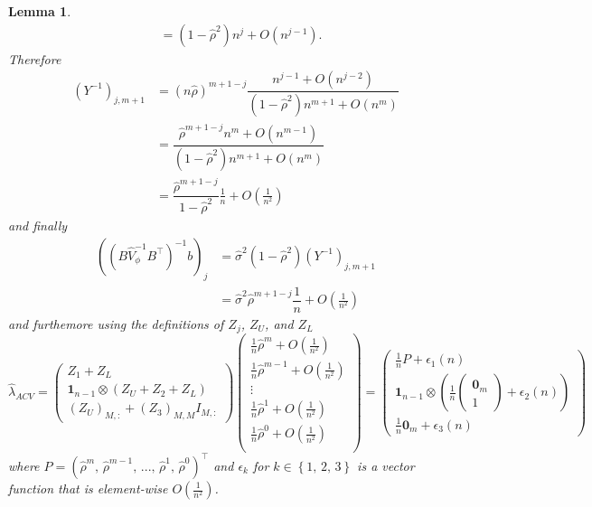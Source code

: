 \documentclass[11pt,dvipsnames]{article}
\newtheorem{lemma}{Lemma}
\begin{document}
\begin{appendices}
\begin{lemma}
\begin{equation}
\begin{split}
&=(1-\hat{\rho}^{2})n^{j}+O(n^{j-1}).
\end{split}
\end{equation}
Therefore 
\begin{equation}
\begin{split}
\left( Y ^{-1}\right) _{j,m+1}&= \left( n\hat{\rho}\right) ^{m+1-j} \dfrac{n^{j-1}+O(n^{j-2})}{(1-\hat{\rho}^{2})n^{m+1}+O(n^{m})}\\
&=\dfrac{\hat{\rho}^{m+1-j}n^{m}+O(n^{m-1})}{(1-\hat{\rho}^{2})n^{m+1}+O(n^{m})}\\
&=\dfrac{\hat{\rho}^{m+1-j}}{1-\hat{\rho}^{2}}\frac{1}{n}+O\left( \frac{1}{n^{2}}\right) 
\end{split}
\end{equation}
and finally
\begin{equation}
\begin{split}
\left( \left( B\widehat{V}_{\phi}^{-1}B^{\top}\right) ^{-1}b\right)_{j}&=\hat{\sigma}^{2}\left( 1-\hat{\rho}^{2}\right) \left( Y ^{-1}\right) _{j,m+1}\\
&=\hat{\sigma}^{2} \hat{\rho}^{m+1-j} \dfrac{1}{n} + O\left( \frac{1}{n^{2}}\right) 
\end{split}
\end{equation}
and furthemore using the definitions of $ Z_{j} $, $ Z_{U} $, and $ Z_{L} $
\begin{equation}
\widehat{\lambda}_{ACV}=
\begin{pmatrix}
Z_{1}+Z_{L}\\
\mathbf{1}_{n-1} \otimes (Z_{U}+Z_{2}+Z_{L})\\
\left( Z_{U}\right)_{M,:}+\left( Z_{3}\right)_{M,M}I_{M,:}
\end{pmatrix}
\begin{pmatrix}
\frac{1}{n}\hat{\rho}^{m} + O(\frac{1}{n^{2}})\\
\frac{1}{n}\hat{\rho}^{m-1} + O(\frac{1}{n^{2}})\\
\vdots \\
\frac{1}{n}\hat{\rho}^{1} + O(\frac{1}{n^{2}})\\
\frac{1}{n}\hat{\rho}^{0} + O(\frac{1}{n^{2}})\\
\end{pmatrix}=
\begin{pmatrix}
\frac{1}{n}P+\epsilon_{1}(n)\\
\mathbf{1}_{n-1} \otimes \left( 
\frac{1}{n}
\begin{pmatrix}
\mathbf{0}_{m}\\
1
\end{pmatrix}
+ \epsilon_{2}(n) \right)  \\
\frac{1}{n}
\mathbf{0}_{m}
+ \epsilon_{3}(n)
\end{pmatrix}
\end{equation}
where $ P=\left( \hat{\rho}^{m},\, \hat{\rho}^{m-1},\,...,\,\hat{\rho}^{1},\,\hat{\rho}^{0} \right)^{\top}  $ and $ \epsilon_{k} $ for $ k \in \left\lbrace 1,\, 2,\,3\right\rbrace  $ is a vector function that is element-wise $ O(\frac{1}{n^{2}}) $. 


\end{lemma}
\end{appendices}
\end{document}
